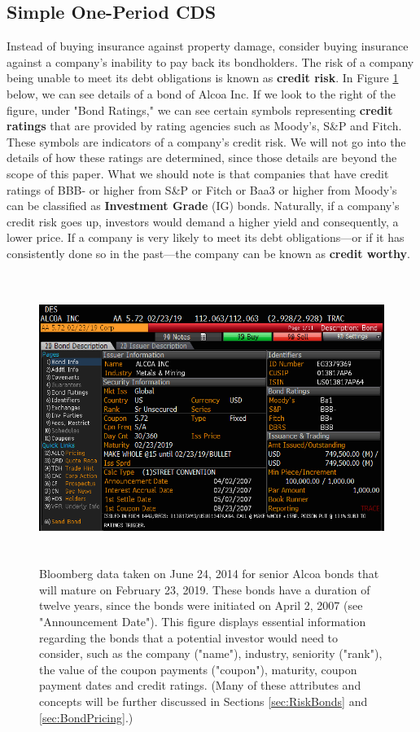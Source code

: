 \documentclass[article]{jss}
\begin{document}
\subsection{Simple One-Period CDS}
\label{sec:OnePeriod}

Instead of buying insurance against property damage, consider buying insurance against a company's inability to pay back its bondholders. The risk of a company being unable to meet its debt obligations is known as \textbf{credit risk}. In Figure \ref{fig:AlcoaBond} below, we can see details of a bond of Alcoa Inc. If we look to the right of the figure, under "Bond Ratings," we can see certain symbols representing \textbf{credit ratings} that are provided by rating agencies such as Moody's, S\&P and Fitch. These symbols are indicators of a company's credit risk. We will not go into the details of how these ratings are determined, since those details are beyond the scope of this paper. What we should note is that companies that have credit ratings of BBB- or higher from S\&P or Fitch or Baa3 or higher from Moody's can be classified as \textbf{Investment Grade} (IG) bonds. Naturally, if a company's credit risk goes up, investors would demand a higher yield and consequently, a lower price. If a company is very likely to meet its debt obligations---or if it has consistently done so in the past---the company can be known as \textbf{credit worthy}.

\begin{figure}[H]
\centering
\includegraphics[width=5in, height=3.7in]{images/AlcoaBond.png}
\caption{Bloomberg data taken on June 24, 2014 for senior Alcoa bonds that will mature on February 23, 2019. These bonds have a duration of twelve years, since the bonds were initiated on April 2, 2007 (see "Announcement Date"). This figure displays essential information regarding the bonds that a potential investor would need to consider, such as the company ("name"), industry, seniority ("rank"), the value of the coupon payments ("coupon"), maturity, coupon payment dates and credit ratings. (Many of these attributes and concepts will be further discussed in Sections \ref{sec:RiskBonds} and \ref{sec:BondPricing}.)}
\label{fig:AlcoaBond}
\end{figure}
\end{document}
